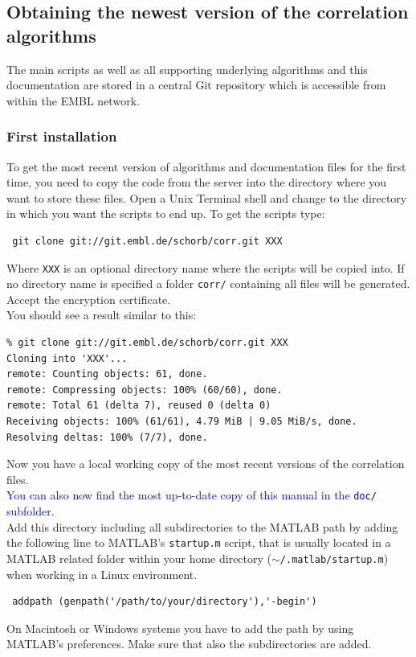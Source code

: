 \documentclass[10pt,a4paper,onepage,DIV12]{scrartcl}
\begin{document}
\subsection{Obtaining the newest version of the correlation algorithms}
The main scripts as well as all supporting underlying algorithms and this documentation are stored in a central Git repository which is accessible from within the EMBL network.
\subsubsection*{First installation}
To get the most recent version of algorithms and documentation files for the first time, you need to copy the code from the server into the directory where you want to store these files. 
Open a Unix Terminal shell and change to the directory in which you want the scripts to end up.
To get the scripts type:
\begin{verbatim}
 git clone git://git.embl.de/schorb/corr.git XXX
\end{verbatim}
Where \texttt{XXX} is an optional directory name where the scripts will be copied into. If no directory name is specified a folder \texttt{corr/} containing all files will be generated. Accept the encryption certificate.\\

You should see a result similar to this:
\begin{verbatim}
% git clone git://git.embl.de/schorb/corr.git XXX
Cloning into 'XXX'...
remote: Counting objects: 61, done.
remote: Compressing objects: 100% (60/60), done.
remote: Total 61 (delta 7), reused 0 (delta 0)
Receiving objects: 100% (61/61), 4.79 MiB | 9.05 MiB/s, done.
Resolving deltas: 100% (7/7), done.
\end{verbatim}

Now you have a local working copy of the most recent versions of the correlation files.\\
\textcolor{blue}{You can also now find the most up-to-date copy of this manual in the \texttt{doc/} subfolder.}\\

Add this directory including all subdirectories to the MATLAB path by adding the following line to MATLAB's \texttt{startup.m} script, that is usually located in a MATLAB related folder within your home directory (\texttt{$\sim$/.matlab/startup.m}) when working in a Linux environment. 
\begin{verbatim}
 addpath (genpath('/path/to/your/directory'),'-begin')
\end{verbatim}
On Macintosh or Windows systems you have to add the path by using MATLAB's preferences. Make sure that also the subdirectories are added.\\
\end{document}

